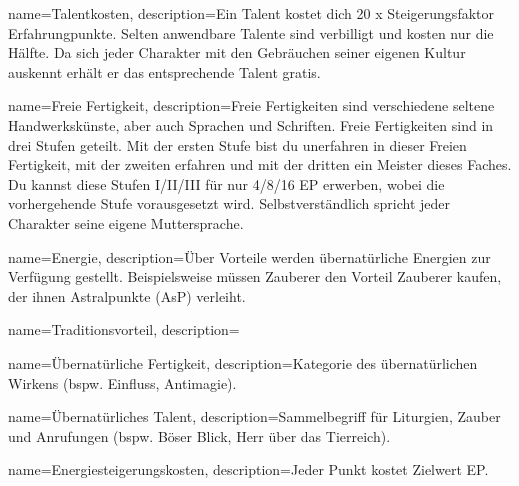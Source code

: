 {
    name={Talentkosten},
    description={Ein Talent kostet dich 20 x Steigerungsfaktor Erfahrung­punkte. Selten anwendbare Talente sind verbilligt und kosten nur die Hälfte. Da sich jeder Charakter mit den Gebräuchen seiner eigenen Kultur auskennt erhält er das entsprechende Talent gratis.}}

{
    name={Freie Fertigkeit},
    description={Freie Fertigkeiten sind verschiedene seltene Handwerks­künste, aber auch Sprachen und Schriften.
Freie Fertigkeiten sind in drei Stufen geteilt. Mit der ersten Stufe bist du unerfahren in dieser Freien Fertigkeit, mit der zweiten erfahren und mit der dritten ein Meister dieses Faches. Du kannst diese Stufen I/II/III für nur 4/8/16 EP erwerben, wobei die vorhergehende Stufe vorausgesetzt wird. Selbstverständlich spricht jeder Charakter seine eigene Muttersprache.}}

{
    name={Energie},
    description={Über Vorteile werden übernatürliche Energien zur Verfügung gestellt. Beispielsweise müssen Zauberer den Vorteil Zauberer kaufen, der ihnen Astralpunkte (AsP) verleiht.}}

{
    name={Traditionsvorteil},
    description={}}

{
    name={Übernatürliche Fertigkeit},
    description={Kategorie des übernatürlichen Wirkens (bspw. Einfluss, Antimagie).}}

{
    name={Übernatürliches Talent},
    description={Sammelbegriff für Liturgien, Zauber und Anrufungen (bspw. Böser Blick, Herr über das Tierreich).}}

{
    name={Energiesteigerungskosten},
    description={Jeder Punkt kostet Zielwert EP.}}
        
        
        
        
    

